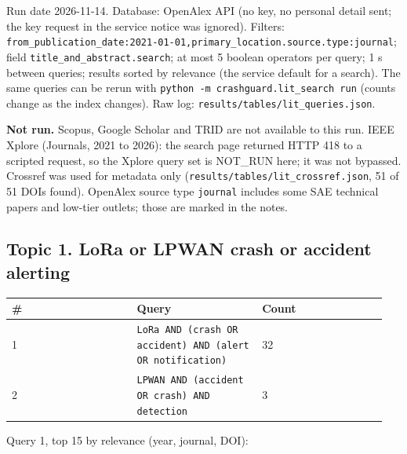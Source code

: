 


Run date 2026-11-14. Database: OpenAlex API (no key, no personal detail sent; the key request in the service notice was ignored). Filters: \texttt{from\_publication\_date:2021-01-01,primary\_location.source.type:journal}; field \texttt{title\_and\_abstract.search}; at most 5 boolean operators per query; 1 s between queries; results sorted by relevance (the service default for a search). The same queries can be rerun with \texttt{python -m crashguard.lit\_search run} (counts change as the index changes). Raw log: \texttt{results/tables/lit\_queries.json}.

\textbf{Not run.} Scopus, Google Scholar and TRID are not available to this run. IEEE Xplore (Journals, 2021 to 2026): the search page returned HTTP 418 to a scripted request, so the Xplore query set is NOT\_RUN here; it was not bypassed. Crossref was used for metadata only (\texttt{results/tables/lit\_crossref.json}, 51 of 51 DOIs found). OpenAlex source type \texttt{journal} includes some SAE technical papers and low-tier outlets; those are marked in the notes.

\subsection*{Topic 1. LoRa or LPWAN crash or accident alerting}

{\scriptsize\raggedright
\begin{longtable}{p{0.317\linewidth}p{0.317\linewidth}p{0.317\linewidth}}
\toprule
\# & Query & Count \\
\midrule
\endhead
1 & \texttt{LoRa AND (crash OR accident) AND (alert OR notification)} & 32 \\
2 & \texttt{LPWAN AND (accident OR crash) AND detection} & 3 \\
\bottomrule
\end{longtable}}

Query 1, top 15 by relevance (year, journal, DOI):

